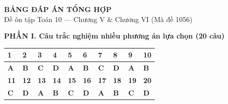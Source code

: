 \documentclass[12pt,a4paper]{article}
\begin{document}
\begin{center}
  {\Large\bfseries\color{ink} BẢNG ĐÁP ÁN TỔNG HỢP}\\[2pt]
  {\small\color{gray!75!black} Đề ôn tập Toán 10 — Chương V \& Chương VI (Mã đề 1056)}
\end{center}
\vspace{1pt}

\noindent\textbf{PHẦN I. Câu trắc nghiệm nhiều phương án lựa chọn (20 câu)}
\vspace{1.5pt}

\begin{center}
\renewcommand{\arraystretch}{1.15}
\begin{tabular}{|C{0.95cm}|C{0.95cm}|C{0.95cm}|C{0.95cm}|C{0.95cm}|C{0.95cm}|C{0.95cm}|C{0.95cm}|C{0.95cm}|C{0.95cm}|}
\hline
\textbf{1} & \textbf{2} & \textbf{3} & \textbf{4} & \textbf{5} & \textbf{6} & \textbf{7} & \textbf{8} & \textbf{9} & \textbf{10} \\ \hline
\textbf{A} & \textbf{B} & \textbf{C} & \textbf{D} & \textbf{A} & \textbf{B} & \textbf{C} & \textbf{D} & \textbf{A} & \textbf{B} \\ \hline
\hline
\textbf{11} & \textbf{12} & \textbf{13} & \textbf{14} & \textbf{15} & \textbf{16} & \textbf{17} & \textbf{18} & \textbf{19} & \textbf{20} \\ \hline
\textbf{C} & \textbf{D} & \textbf{A} & \textbf{B} & \textbf{C} & \textbf{D} & \textbf{A} & \textbf{B} & \textbf{C} & \textbf{D} \\ \hline
\end{tabular}
\end{center}
\end{document}
